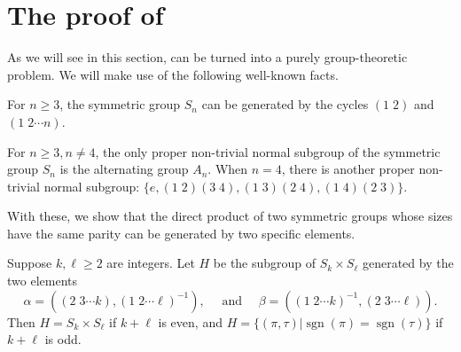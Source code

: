 \documentclass{mystyle}
\begin{document}
\section{The proof of }\label{sec_stopwatch}
As we will see in this section,  can be turned into a purely group-theoretic problem. We will make use of the following well-known facts.
\begin{lemma}\label{lem_generators}
    For $n \geq 3$, the symmetric group $S_n$ can be generated by the cycles $(1 \; 2)$ and $(1 \; 2 \cdots n)$.
\end{lemma}
\begin{lemma}\label{lem_normal_subgroup}
    For $n \geq 3, n \neq 4$, the only proper non-trivial normal subgroup of the symmetric group $S_n$ is the alternating group $A_n$. When $n = 4$, there is another proper non-trivial normal subgroup: $\{e, (1 \; 2) (3 \; 4), (1 \; 3) (2 \; 4), (1 \; 4) (2 \; 3)\}$.
\end{lemma}
With these, we show that the direct product of two symmetric groups whose sizes have the same parity can be generated by two specific elements.
\begin{proposition}\label{prop_alpha_beta}
    Suppose $k,\ell\geq 2$ are integers. Let $H$ be the subgroup of $S_k \times S_\ell$ generated by the two elements
    \[
        \alpha = ((2 \; 3 \cdots k), (1 \; 2 \cdots \ell)^{-1}), \quad \text{ and } \quad 
        \beta = ((1 \; 2 \cdots k)^{-1}, (2 \; 3 \cdots \ell)).
    \]
    Then $H = S_k \times S_\ell$ if $k + \ell$ is even, and $H = \{(\pi, \tau)| \operatorname{sgn}(\pi) = \operatorname{sgn}(\tau)\}$ if $k + \ell$ is odd.
\end{proposition}
\end{document}
